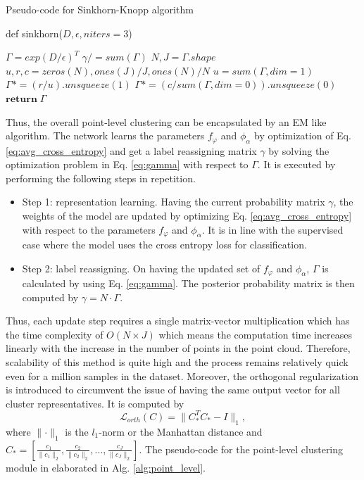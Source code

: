 \begin{algorithm}[h]
    \caption{Pseudo-code for Sinkhorn-Knopp algorithm}\label{alg:sinkhorn}
    def sinkhorn($D, \epsilon, niters=3$)
    \begin{algorithmic}[1]
        \State $\Gamma = exp(D/ \epsilon)^T$
        \State $\gamma /= sum(\Gamma)$
        \State $N, J = \Gamma .shape$
        \State $u,r,c = zeros(N), ones(J)/J, ones(N)/N$
            \State $u = sum(\Gamma, dim=1)$
            \State $\Gamma *= (r/u).unsqueeze(1)$
            \State $\Gamma *= (c/sum(\Gamma, dim=0)).unsqueeze(0)$            
        \EndFor
        \State $\mathbf{return} \; \Gamma$          
    \end{algorithmic}
\end{algorithm}

Thus, the overall point-level clustering can be encapsulated by an \ac{EM} like algorithm. The network learns the parameters $f_{\varphi}$ and $\mathcal{\phi}_{\alpha}$ by optimization of Eq.\ref{eq:avg_cross_entropy} and get a label reassigning matrix $\gamma$ by solving the optimization problem in Eq. \ref{eq:gamma} with respect to $\Gamma$. It is executed by performing the following steps in repetition. 
\begin{itemize}
    \item Step 1: representation learning. Having the current probability matrix $\gamma$, the weights of the model are updated by optimizing Eq. \ref{eq:avg_cross_entropy} with respect to the  parameters $f_{\varphi}$ and $\mathcal{\phi}_{\alpha}$. It is in line with the supervised case where the model uses the cross entropy loss for classification. 
    \item Step 2: label reassigning. On having the updated set of $f_{\varphi}$ and $\mathcal{\phi}_{\alpha}$, $\Gamma$ is calculated by using Eq. \ref{eq:gamma}. The posterior probability matrix is then computed by $\gamma = \mathit{N} \cdot \Gamma$.
\end{itemize}
Thus, each update step requires a single matrix-vector multiplication which has the time complexity of $O(\mathit{N \times J})$ which means the computation time increases linearly with the increase in the number of points in the point cloud. Therefore, scalability of this method is quite high and the process remains relatively quick even for a million samples in the dataset. Moreover, the orthogonal regularization is introduced to circumvent the issue of having the same output vector for all cluster representatives. It is computed by 
\begin{equation}
    \label{eq:orth}
    \mathcal{L}_{\mathit{orth}}(\mathit{C}) = \lVert \mathit{C_{*}^{T} C_{*} - I} \rVert _{1},
\end{equation}
where $ \lVert \cdot \rVert _1 $ is the $l_{1}$-norm or the Manhattan distance and $\mathit{C_{*}} = [ \frac{c_1}{\lVert c_1 \rVert _{2}}, \frac{c_2}{\lVert c_2 \rVert _{2}}, ... , \frac{c_{\mathit{J}}}{\lVert c_{\mathit{J}} \rVert _{2}}]$. The pseudo-code for the point-level clustering module in elaborated in Alg. \ref{alg:point_level}.

